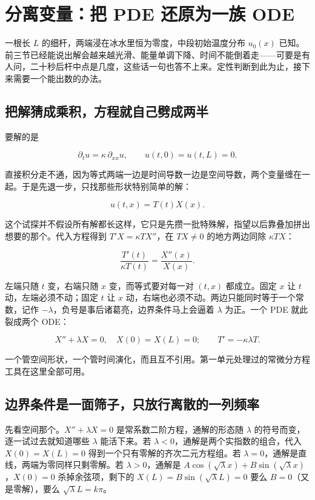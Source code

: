 \section{分离变量：把 PDE 还原为一族 ODE}
\label{sec:15-Differential-Equations-and-Dynamical-Systems/03-PDE-Introduction/04}

一根长 \(L\) 的细杆，两端浸在冰水里恒为零度，中段初始温度分布 \(u_0(x)\) 已知。前三节已经能说出解会越来越光滑、能量单调下降、时间不能倒着走——可要是有人问，二十秒后杆中点是几度，这些话一句也答不上来。定性判断到此为止，接下来需要一个能出数的办法。

\subsection{把解猜成乘积，方程就自己劈成两半}

要解的是

\[
\partial_tu=\kappa\,\partial_{xx}u,\qquad u(t,0)=u(t,L)=0 .
\]

直接积分走不通，因为等式两端一边是时间导数一边是空间导数，两个变量缠在一起。于是先退一步，只找那些形状特别简单的解：

\[
u(t,x)=T(t)X(x).
\]

这个试探并不假设所有解都长这样，它只是先攒一批特殊解，指望以后靠叠加拼出想要的那个。代入方程得到 \(T'X=\kappa TX''\)，在 \(T X\neq0\) 的地方两边同除 \(\kappa TX\)：

\[
\frac{T'(t)}{\kappa T(t)}=\frac{X''(x)}{X(x)} .
\]

左端只随 \(t\) 变，右端只随 \(x\) 变，而等式要对每一对 \((t,x)\) 都成立。固定 \(x\) 让 \(t\) 动，左端必须不动；固定 \(t\) 让 \(x\) 动，右端也必须不动。两边只能同时等于一个常数，记作 \(-\lambda\)，负号是事后诸葛亮，边界条件马上会逼着 \(\lambda\) 为正。一个 PDE 就此裂成两个 ODE：

\[
X''+\lambda X=0,\quad X(0)=X(L)=0;
\qquad
T'=-\kappa\lambda T .
\]

一个管空间形状，一个管时间演化，而且互不引用。第一单元处理过的常微分方程工具在这里全部可用。

\subsection{边界条件是一面筛子，只放行离散的一列频率}

先看空间那个。\(X''+\lambda X=0\) 是常系数二阶方程，通解的形态随 \(\lambda\) 的符号而变，逐一试过去就知道哪些 \(\lambda\) 能活下来。若 \(\lambda<0\)，通解是两个实指数的组合，代入 \(X(0)=X(L)=0\) 得到一个只有零解的齐次二元方程组。若 \(\lambda=0\)，通解是直线，两端为零同样只剩零解。若 \(\lambda>0\)，通解是 \(A\cos(\sqrt\lambda x)+B\sin(\sqrt\lambda x)\)，\(X(0)=0\) 杀掉余弦项，剩下的 \(X(L)=B\sin(\sqrt\lambda L)=0\) 要么 \(B=0\)（又是零解），要么 \(\sqrt\lambda L=k\pi\)。

